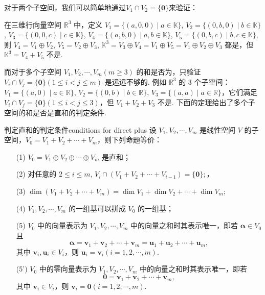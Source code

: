 \documentclass[12pt, a4paper,newtx]{ctexart}
\begin{document}
对于两个子空间，我们可以简单地通过$V_1\cap V_2=\{\bm 0\}$来验证：\begin{example}{}{}
	在三维行向量空间 $\mathbb{R}^3$ 中，定义 $V_1 = \{(a,0,0) \mid a \in \mathbb{K}\}$, $V_2 = \{(0,b,0) \mid b \in \mathbb{K}\}$, $V_3 = \{(0,0,c) \mid c \in \mathbb{K}\}$, $V_4 = \{(a,b,0) \mid a, b \in \mathbb{K}\}$, $V_5 = \{(0,b,c) \mid b, c \in \mathbb{K}\}$, 则 $V_4 = V_1 \oplus V_2$, $V_5 = V_2 \oplus V_3$, $\mathbb{K}^3 = V_3 \oplus V_4 = V_1 \oplus V_5 = V_1 \oplus V_2 \oplus V_3$ 都是，但 $\mathbb{K}^3 = V_4 + V_5$ 不是. 
\end{example}
而对于多个子空间 $V_1, V_2, \cdots, V_m (m \geqslant 3)$ 的和是否为，只验证 $V_i \cap V_j = \{\bm 0\} (1 \leqslant i < j \leqslant m)$ 是远远不够的. 例如 $\mathbb{R}^3$ 的 3 个子空间：$V_1 = \{(a, 0) \mid a \in \mathbb{R}\}$, $V_2 = \{(0, b) \mid b \in \mathbb{R}\}$, $V_3 = \{(a, a) \mid a \in \mathbb{R}\}$，它们满足 $V_i \cap V_j = \{\bm 0\} (1 \leqslant i < j \leqslant 3)$，但 $V_1 + V_2 + V_3$ 不是. 下面的定理给出了多个子空间的和是否是直和的判定条件. 
\begin{theorem}{判定直和的判定条件}{conditions for direct plus}
	设 $V_1, V_2, \cdots, V_m$ 是线性空间 $V$ 的子空间，$V_0 = V_1 + V_2 + \cdots + V_m$，则下列命题等价：
	\begin{enumerate}
		\item[(1)] $V_0 = V_1 \oplus V_2 \oplus \cdots \oplus V_m$ 是直和；
		\item[(2)] 对任意的 $2 \leqslant i \leqslant m,\,V_i \cap (V_1 + V_2 + \cdots + V_{i-1}) = \{\bm 0\};$，
		\item[(3)] $\dim(V_1 + V_2 + \cdots + V_m) = \dim V_1 + \dim V_2 + \cdots + \dim V_m$;
		\item[(4)] $V_1, V_2, \cdots, V_m$ 的一组基可以拼成 $V_0$ 的一组基；
		\item[(5)] $V_0$ 中的向量表示为 $V_1, V_2, \cdots, V_m$ 中的向量之和时其表示唯一，即若 $\bm\alpha \in V_0$ 且
		\[
		\bm\alpha = \bm v_1 + \bm v_2 + \cdots + \bm v_m =\bm u_1 + \bm u_2 + \cdots + \bm u_m,
		\]
		其中 $\bm v_i, \bm u_i \in V_i$，则 $\bm u_i =\bm v_i (i = 1, 2, \cdots, m)$. 
		\item[(5')] $V_0$ 中的零向量表示为 $V_1, V_2, \cdots, V_m$ 中的向量之和时其表示唯一，即若
		\[
		\bm 0 = \bm v_1 + \bm v_2 + \cdots + \bm v_m,
		\]
		其中 $\bm v_i \in V_i$，则 $\bm v_i = \bm 0 (i = 1, 2, \cdots, m)$.
	\end{enumerate}
\end{theorem}
\end{document}
